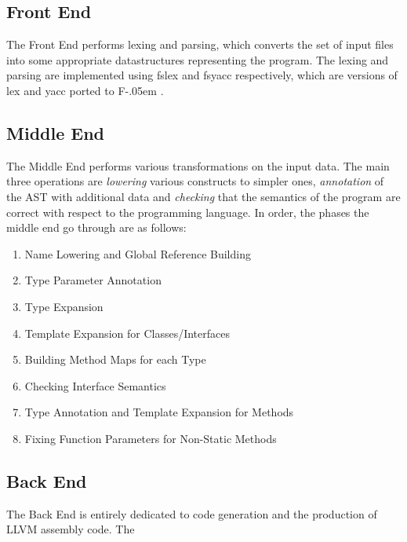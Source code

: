 \documentclass{article}
\newcommand{\sharponend}[1]{{\settoheight{\dimen0}{#1}#1\kern-.05em \resizebox{!}{\dimen0}{\raisebox{\depth}{\fontseries{b}\selectfont\#}}}}
\newcommand{\fsharp}{\sharponend{F}\xspace}
\begin{document}

\subsection{Front End}
The Front End performs lexing and parsing, which converts the set of input files into some appropriate datastructures representing the program. The lexing and parsing are implemented using fslex and fsyacc respectively, which are versions of lex and yacc ported to \fsharp. 

\subsection{Middle End}
The Middle End performs various transformations on the input data. The main three operations are \textit{lowering} various constructs to simpler ones, \textit{annotation} of the AST with additional data and \textit{checking} that the semantics of the program are correct with respect to the programming language. In order, the phases the middle end go through are as follows:\\
\begin{enumerate}
	\item{Name Lowering and Global Reference Building}
	\item{Type Parameter Annotation}
	\item{Type Expansion}
	\item{Template Expansion for Classes/Interfaces}
	\item{Building Method Maps for each Type}
	\item{Checking Interface Semantics}
	\item{Type Annotation and Template Expansion for Methods}
	\item{Fixing Function Parameters for Non-Static Methods}
\end{enumerate}

\subsection{Back End}
The Back End is entirely dedicated to code generation and the production of LLVM assembly code. The 
\end{document}

